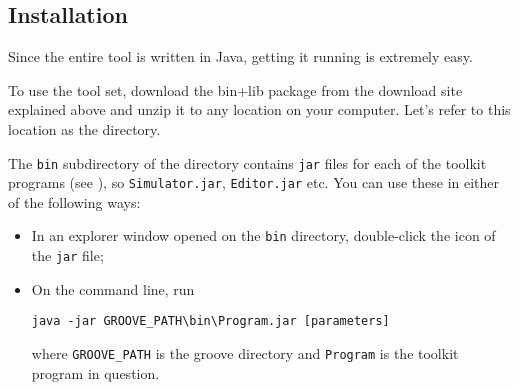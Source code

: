 \DTLsetseparator{;}

\begin{itemize}[noitemsep]
\end{itemize}

\subsection{Installation}

Since the entire \GROOVE tool is written in Java, getting it running is
extremely easy.

\medskip\noindent
To use the \GROOVE tool set, download the bin+lib package from the download
site explained above and unzip it to any location on your computer. Let's refer
to this location as the \GROOVE directory.

The \texttt{bin} subdirectory of the \GROOVE directory contains \texttt{jar}
files for each of the toolkit programs (see ), so
\texttt{Simulator.jar}, \texttt{Editor.jar} etc. You can use these in either of
the following ways:
\begin{itemize}
\item In an explorer window opened on the \texttt{bin} directory, double-click
  the icon of the \texttt{jar} file;
\item On the command line, run
%
\begin{verbatim}
java -jar GROOVE_PATH\bin\Program.jar [parameters]
\end{verbatim}
%
  where \texttt{GROOVE\_PATH} is the groove directory and \texttt{Program} is
  the toolkit program in question.
\end{itemize}
